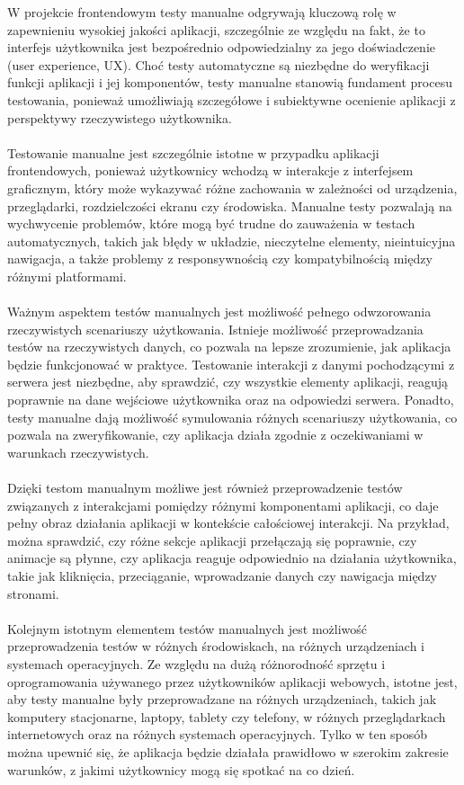 \documentclass[12pt,a4paper]{article}
\begin{document}
\noindent
W projekcie frontendowym testy manualne odgrywają kluczową rolę w zapewnieniu wysokiej jakości aplikacji, szczególnie ze względu na fakt, że to interfejs użytkownika jest bezpośrednio odpowiedzialny za jego doświadczenie (user experience, UX). Choć testy automatyczne są niezbędne do weryfikacji funkcji aplikacji i jej komponentów, testy manualne stanowią fundament procesu testowania, ponieważ umożliwiają szczegółowe i subiektywne ocenienie aplikacji z perspektywy rzeczywistego użytkownika.
\\\\
Testowanie manualne jest szczególnie istotne w przypadku aplikacji frontendowych, ponieważ użytkownicy wchodzą w interakcje z interfejsem graficznym, który może wykazywać różne zachowania w zależności od urządzenia, przeglądarki, rozdzielczości ekranu czy środowiska. Manualne testy pozwalają na wychwycenie problemów, które mogą być trudne do zauważenia w testach automatycznych, takich jak błędy w układzie, nieczytelne elementy, nieintuicyjna nawigacja, a także problemy z responsywnością czy kompatybilnością między różnymi platformami.
\\\\
Ważnym aspektem testów manualnych jest możliwość pełnego odwzorowania rzeczywistych scenariuszy użytkowania. Istnieje możliwość przeprowadzania testów na rzeczywistych danych, co pozwala na lepsze zrozumienie, jak aplikacja będzie funkcjonować w praktyce. Testowanie interakcji z danymi pochodzącymi z serwera jest niezbędne, aby sprawdzić, czy wszystkie elementy aplikacji, reagują poprawnie na dane wejściowe użytkownika oraz na odpowiedzi serwera. Ponadto, testy manualne dają możliwość symulowania różnych scenariuszy użytkowania, co pozwala na zweryfikowanie, czy aplikacja działa zgodnie z oczekiwaniami w warunkach rzeczywistych.
\\\\
Dzięki testom manualnym możliwe jest również przeprowadzenie testów związanych z interakcjami pomiędzy różnymi komponentami aplikacji, co daje pełny obraz działania aplikacji w kontekście całościowej interakcji. Na przykład, można sprawdzić, czy różne sekcje aplikacji przełączają się poprawnie, czy animacje są płynne, czy aplikacja reaguje odpowiednio na działania użytkownika, takie jak kliknięcia, przeciąganie, wprowadzanie danych czy nawigacja między stronami.
\\\\
Kolejnym istotnym elementem testów manualnych jest możliwość przeprowadzenia testów w różnych środowiskach, na różnych urządzeniach i systemach operacyjnych. Ze względu na dużą różnorodność sprzętu i oprogramowania używanego przez użytkowników aplikacji webowych, istotne jest, aby testy manualne były przeprowadzane na różnych urządzeniach, takich jak komputery stacjonarne, laptopy, tablety czy telefony, w różnych przeglądarkach internetowych oraz na różnych systemach operacyjnych. Tylko w ten sposób można upewnić się, że aplikacja będzie działała prawidłowo w szerokim zakresie warunków, z jakimi użytkownicy mogą się spotkać na co dzień.
\end{document}
